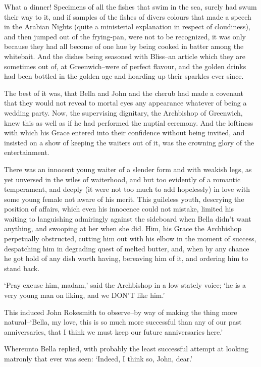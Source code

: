 What a dinner! Specimens of all the fishes that swim in the sea, surely
had swum their way to it, and if samples of the fishes of divers
colours that made a speech in the Arabian Nights (quite a ministerial
explanation in respect of cloudiness), and then jumped out of the
frying-pan, were not to be recognized, it was only because they had all
become of one hue by being cooked in batter among the whitebait. And the
dishes being seasoned with Bliss--an article which they are sometimes
out of, at Greenwich--were of perfect flavour, and the golden drinks
had been bottled in the golden age and hoarding up their sparkles ever
since.

The best of it was, that Bella and John and the cherub had made a
covenant that they would not reveal to mortal eyes any appearance
whatever of being a wedding party. Now, the supervising dignitary, the
Archbishop of Greenwich, knew this as well as if he had performed the
nuptial ceremony. And the loftiness with which his Grace entered into
their confidence without being invited, and insisted on a show
of keeping the waiters out of it, was the crowning glory of the
entertainment.

There was an innocent young waiter of a slender form and with weakish
legs, as yet unversed in the wiles of waiterhood, and but too evidently
of a romantic temperament, and deeply (it were not too much to add
hopelessly) in love with some young female not aware of his merit.
This guileless youth, descrying the position of affairs, which even
his innocence could not mistake, limited his waiting to languishing
admiringly against the sideboard when Bella didn’t want anything, and
swooping at her when she did. Him, his Grace the Archbishop perpetually
obstructed, cutting him out with his elbow in the moment of success,
despatching him in degrading quest of melted butter, and, when by any
chance he got hold of any dish worth having, bereaving him of it, and
ordering him to stand back.

‘Pray excuse him, madam,’ said the Archbishop in a low stately voice;
‘he is a very young man on liking, and we DON’T like him.’

This induced John Rokesmith to observe--by way of making the thing more
natural--‘Bella, my love, this is so much more successful than any
of our past anniversaries, that I think we must keep our future
anniversaries here.’

Whereunto Bella replied, with probably the least successful attempt at
looking matronly that ever was seen: ‘Indeed, I think so, John, dear.’

